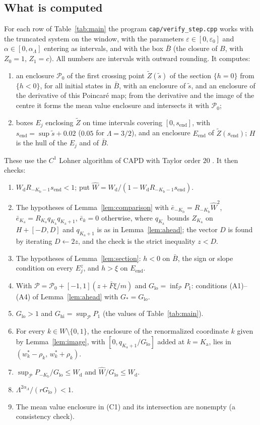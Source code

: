 \documentclass[12pt,reqno]{amsart}
\numberwithin{equation}{section}
\theoremstyle{plain}
\theoremstyle{definition}
\theoremstyle{remark}
\newcommand{\Kb}{K_{\mathrm b}}
\newcommand{\Ka}{K_{\mathrm a}}
\newcommand{\Glo}{G_{\mathrm{lo}}}
\newcommand{\Ghi}{G_{\mathrm{hi}}}
\newcommand{\send}{s_{\mathrm{end}}}
\newcommand{\Wd}{W_{\mathrm d}}
\newcommand{\eps}{\varepsilon}
\begin{document}
\subsection{What is computed}
For each row of Table~\ref{tab:main} the program \texttt{cap/verify\_step.cpp}
\cite{Data} works with the truncated system on the window, with the
parameters $\eps\in[0,\eps_0]$ and $\alpha\in[0,\alpha_\Lambda]$ entering as intervals, and
with the box $\bar B$ (the closure of $B$, with $Z_0=1$, $Z_1=c$). All numbers
are intervals with outward rounding. It computes:
\begin{enumerate}[label=\textup{(C\arabic*)}]
\item an enclosure $\mathcal P_0$ of the first crossing point $\tilde Z(\tilde s)$ of the
  section $\{h=0\}$ from $\{h<0\}$, for all initial states in $\bar B$, with
  an enclosure of $\tilde s$, and an enclosure of the derivative of this
  Poincar\'e map; from the derivative and the image of the centre it
  forms the mean value enclosure and intersects it with $\mathcal P_0$;
\item boxes $E_j$ enclosing $\tilde Z$ on time intervals covering $[0,\send]$, with
  $\send=\sup\tilde s+0.02$ ($0.05$ for $\Lambda=3/2$), and an enclosure
  $E_{\mathrm{end}}$ of $\tilde Z(\send)$; $H$ is the hull of the $E_j$ and of $\bar B$.
\end{enumerate}
These use the $C^1$ Lohner algorithm of CAPD with Taylor order $20$
\cite{CAPD21,Zgl02}. It then checks:
\begin{enumerate}[label=\textup{(V\arabic*)}]
\item $\Wd R_{-\Kb-1}\send<1$; put $\widehat W=\Wd/(1-\Wd R_{-\Kb-1}\send)$.
\item The hypotheses of Lemma~\ref{lem:comparison} with $\bar e_{-\Kb}=R_{-\Kb}\widehat W^2$,
  $\bar e_{\Ka}=R_{\Ka}q_{\Ka}q_{\Ka+1}$, $\bar e_k=0$ otherwise, where $q_{\Ka}$ bounds
  $Z_{\Ka}$ on $H+[-D,D]$ and $q_{\Ka+1}$ is as in Lemma~\ref{lem:ahead}; the vector
  $D$ is found by iterating $D\leftarrow2z$, and the check is the strict
  inequality $z<D$.
\item The hypotheses of Lemma~\ref{lem:section}: $h<0$ on $\bar B$, the sign or
  slope condition on every $E_j^z$, and $h>\xi$ on $E_{\mathrm{end}}$.
\item With $\mathcal P=\mathcal P_0+[-1,1](z+\bar F\xi/m)$ and $\Glo=\inf_{\mathcal P}P_1$:
  conditions (A1)--(A4) of Lemma~\ref{lem:ahead} with $G_*=\Glo$.
\item $\Glo>1$ and $\Ghi=\sup_{\mathcal P}P_1$ (the values of Table~\ref{tab:main}).
\item For every $k\in W\setminus\{0,1\}$, the enclosure of the renormalized
  coordinate $k$ given by Lemma~\ref{lem:image}, with $[0,q_{\Ka+1}/\Glo]$ added
  at $k=\Ka$, lies in $(w^*_k-\rho_k,\,w^*_k+\rho_k)$.
\item $\sup_{\mathcal P}P_{-\Kb}/\Glo\le\Wd$ and $\widehat W/\Glo\le\Wd$.
\item $\Lambda^{2\alpha_\Lambda}/(r\Glo)<1$.
\item The mean value enclosure in (C1) and its intersection are nonempty
  (a consistency check).
\end{enumerate}
\end{document}
